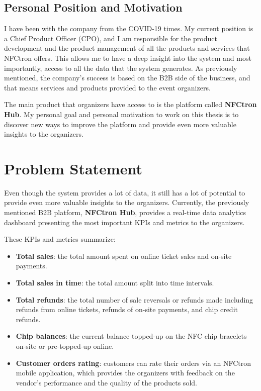 \subsection*{Personal Position and Motivation}
\label{subsec:introduction-background-motivation}
I have been with the company from the COVID-19 times.
My current position is a Chief Product Officer (CPO), and I am responsible for the product development and the product management of all the products and services that NFCtron offers.
This allows me to have a deep insight into the system and most importantly, access to all the data that the system generates.
As previously mentioned, the company's success is based on the B2B side of the business, and that means services and products provided to the event organizers.

The main product that organizers have access to is the platform called \textbf{NFCtron Hub}.
My personal goal and personal motivation to work on this thesis is to discover new ways to improve the platform and provide even more valuable insights to the organizers.

\section*{Problem Statement}
\label{sec:introduction-problem-statement}
Even though the system provides a lot of data, it still has a lot of potential to provide even more valuable insights to the organizers.
Currently, the previously mentioned B2B platform, \textbf{NFCtron Hub}, provides a real-time data analytics dashboard presenting the most important KPIs and metrics to the organizers.

These KPIs and metrics summarize:
\begin{itemize}
	\item \textbf{Total sales}: the total amount spent on online ticket sales and on-site payments.
	\item \textbf{Total sales in time}: the total amount split into time intervals.
	\item \textbf{Total refunds}: the total number of sale reversals or refunds made including refunds from online tickets, refunds of on-site payments, and chip credit refunds.
	\item \textbf{Chip balances}: the current balance topped-up on the NFC chip bracelets on-site or pre-topped-up online.
	\item \textbf{Customer orders rating}: customers can rate their orders via an NFCtron mobile application, which provides the organizers with feedback on the vendor's performance and the quality of the products sold.
\end{itemize}

